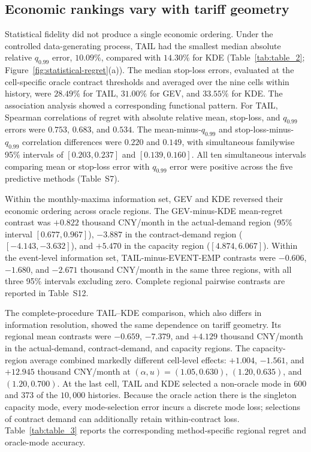 \documentclass[Times1COL]{WileyNJDv5}
\begin{document}
\subsection{Economic rankings vary with tariff geometry}
\label{sec:results-economic-value}

Statistical fidelity did not produce a single economic ordering.
Under the controlled data-generating process, TAIL had the smallest
median absolute relative $q_{0.99}$ error, $10.09\%$, compared with
$14.30\%$ for KDE
(Table~\ref{tab:table_2}; Figure~\ref{fig:statistical-regret}(a)).
The median stop-loss errors, evaluated at the cell-specific oracle
contract thresholds and averaged over the nine cells within history,
were $28.49\%$ for TAIL, $31.00\%$ for GEV, and $33.55\%$ for KDE.
The association analysis showed a corresponding functional pattern.
For TAIL, Spearman correlations of regret with absolute relative mean,
stop-loss, and $q_{0.99}$ errors were $0.753$, $0.683$, and $0.534$.
The mean-minus-$q_{0.99}$ and stop-loss-minus-$q_{0.99}$ correlation
differences were $0.220$ and $0.149$, with simultaneous familywise
95\% intervals of $[0.203,0.237]$ and $[0.139,0.160]$.
All ten simultaneous intervals comparing mean or stop-loss error with
$q_{0.99}$ error were positive across the five predictive methods
(Table~S7).

Within the monthly-maxima information set, GEV and KDE reversed their
economic ordering across oracle regions. The GEV-minus-KDE mean-regret
contrast was $+0.822$ thousand CNY/month in the actual-demand region
(95\% interval $[0.677,0.967]$), $-3.887$ in the contract-demand
region ($[-4.143,-3.632]$), and $+5.470$ in the capacity region
($[4.874,6.067]$). Within the event-level information set,
TAIL-minus-EVENT-EMP contrasts were $-0.606$, $-1.680$, and
$-2.671$ thousand CNY/month in the same three regions, with all three
95\% intervals excluding zero. Complete regional pairwise contrasts
are reported in Table~S12.

The complete-procedure TAIL--KDE comparison, which also differs in
information resolution, showed the same dependence on tariff geometry.
Its regional mean contrasts were $-0.659$, $-7.379$, and $+4.129$
thousand CNY/month in the actual-demand, contract-demand, and capacity
regions. The capacity-region average combined markedly different
cell-level effects: $+1.004$, $-1.561$, and $+12.945$ thousand
CNY/month at $(\alpha,u)=(1.05,0.630)$, $(1.20,0.635)$, and
$(1.20,0.700)$. At the last cell, TAIL and KDE selected a non-oracle
mode in 600 and 373 of the $10{,}000$ histories. Because the oracle
action there is the singleton capacity mode, every mode-selection error
incurs a discrete mode loss; selections of contract demand can
additionally retain within-contract loss. Table~\ref{tab:table_3}
reports the corresponding method-specific regional regret and
oracle-mode accuracy.
\end{document}
